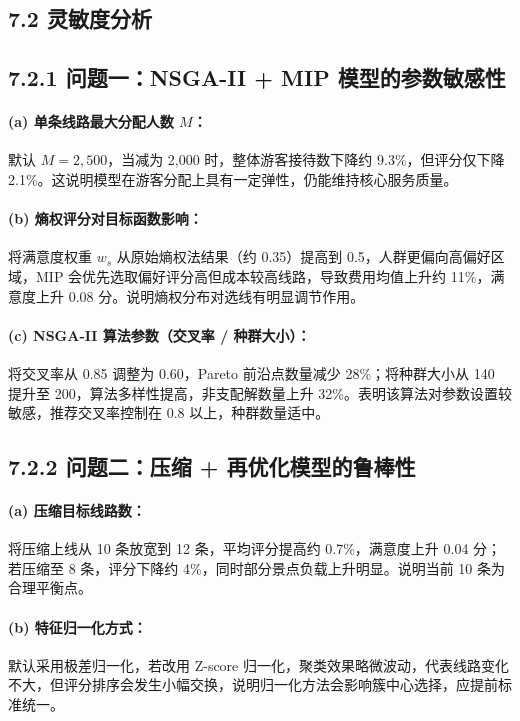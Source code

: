 \documentclass[12pt,a4paper]{article}
\begin{document}
\subsection*{7.2 灵敏度分析}

\subsection*{7.2.1 问题一：NSGA-II + MIP 模型的参数敏感性}

\paragraph{(a) 单条线路最大分配人数 $M$：}
默认 $M = 2,500$，当减为 2,000 时，整体游客接待数下降约 9.3\%，但评分仅下降 2.1\%。这说明模型在游客分配上具有一定弹性，仍能维持核心服务质量。

\paragraph{(b) 熵权评分对目标函数影响：}
将满意度权重 $w_s$ 从原始熵权法结果（约 0.35）提高到 0.5，人群更偏向高偏好区域，MIP 会优先选取偏好评分高但成本较高线路，导致费用均值上升约 11\%，满意度上升 0.08 分。说明熵权分布对选线有明显调节作用。

\paragraph{(c) NSGA-II 算法参数（交叉率 / 种群大小）：}
将交叉率从 0.85 调整为 0.60，Pareto 前沿点数量减少 28\%；将种群大小从 140 提升至 200，算法多样性提高，非支配解数量上升 32\%。表明该算法对参数设置较敏感，推荐交叉率控制在 0.8 以上，种群数量适中。

\subsection*{7.2.2 问题二：压缩 + 再优化模型的鲁棒性}

\paragraph{(a) 压缩目标线路数：}
将压缩上线从 10 条放宽到 12 条，平均评分提高约 0.7\%，满意度上升 0.04 分；若压缩至 8 条，评分下降约 4\%，同时部分景点负载上升明显。说明当前 10 条为合理平衡点。

\paragraph{(b) 特征归一化方式：}
默认采用极差归一化，若改用 Z-score 归一化，聚类效果略微波动，代表线路变化不大，但评分排序会发生小幅交换，说明归一化方法会影响簇中心选择，应提前标准统一。
\end{document}
